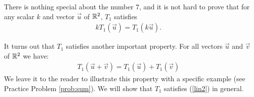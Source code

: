 \documentclass{ximera}
\begin{document}
\begin{exploration}



There is nothing special about the number $7$, and it is not hard to prove that for any scalar $k$ and vector $\vec{u}$ of $\mathbb{R}^2$, $T_1$ satisfies
\begin{align}\label{lin1} kT_1(\vec{u})= T_1(k\vec{u}).\end{align}

It turns out that $T_1$ satisfies another important property. For all vectors $\vec{u}$ and $\vec{v}$ of $\mathbb{R}^2$ we have:
\begin{align}\label{lin2} T_1(\vec{u}+\vec{v}) = T_1(\vec{u})+T_1(\vec{v})\end{align}
We leave it to the reader to illustrate this property with a specific example (see Practice Problem \ref{prob:sum}).  We will show that $T_1$ satisfies (\ref{lin2}) in general.


\end{exploration}
\end{document}

